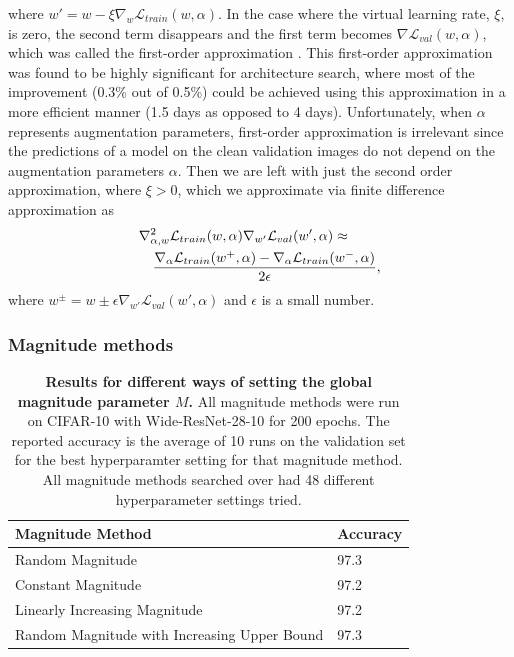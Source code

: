 where $w' = w - \xi \nabla_w \mathcal{L}_{train} (w,\alpha)$. In the case where the virtual learning rate, $\xi$, is zero, the second term disappears and the first term becomes $\nabla \mathcal{L}_{val}(w,\alpha)$, which was called the first-order approximation \cite{liu2018darts}. This first-order approximation was found to be highly significant for architecture search, where most of the improvement (0.3\% out of 0.5\%) could be achieved using this approximation in a more efficient manner (1.5 days as opposed to 4 days). Unfortunately, when $\alpha$ represents augmentation parameters, first-order approximation is irrelevant since the predictions of a model on the clean validation images do not depend on the augmentation parameters $\alpha$. Then we are left with just the second order approximation, where $\xi>0$, which we approximate via finite difference approximation as
\begin{eqnarray}
\lefteqn{\nabla^2_{\alpha,w} \mathcal{L}_{train} ( w, \alpha) \nabla_{w'}\mathcal{L}_{val}(w',\alpha) \approx}\nonumber \\&&\frac{\nabla_\alpha \mathcal{L}_{train}(w^+, \alpha) - \nabla_\alpha \mathcal{L}_{train}(w^-, \alpha) }{2\epsilon},
\label{finite_difference}
\end{eqnarray}
where $w^{\pm} = w \pm \epsilon \nabla_{w'}\mathcal{L}_{val}(w', \alpha)$ and $\epsilon$ is a small number. 

\subsubsection{Magnitude methods}
\label{sec:magnitude_methods}
\begin{table}[t]
\centering
\small
\begin{tabular}{ll}
  \hline
  Magnitude Method & Accuracy \\
  
  \hline 
  Random Magnitude & 97.3 \\
  Constant Magnitude & 97.2 \\
  Linearly Increasing Magnitude & 97.2 \\
  Random Magnitude with Increasing Upper Bound & 97.3 \\
  \hline 
\end{tabular}
\vspace{0.2cm}
\caption{\textbf{Results for different ways of setting the global magnitude parameter $M$.} All magnitude methods were run on CIFAR-10 with Wide-ResNet-28-10 for 200 epochs. The reported accuracy is the average of 10 runs on the validation set for the best hyperparamter setting for that magnitude method. All magnitude methods searched over had 48 different hyperparameter settings tried.}
\label{tab:magnitude_results}  
\end{table}


